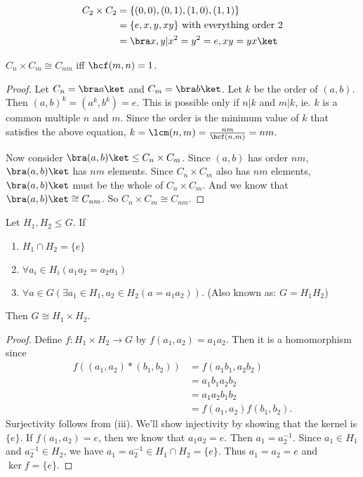 \documentclass[a4paper]{article}
\begin{document}
\begin{eg}
  \begin{align*}
    C_2\times C_2 &= \{(0, 0), (0, 1), (1, 0), (1, 1)\}\\
    &= \{e, x, y, xy\} \text{ with everything order 2}\\
    &= \bra x, y|x^2=y^2=e, xy = yx\ket
  \end{align*}
\end{eg}

\begin{prop}
  $C_n\times C_m\cong C_{nm}$ iff $\hcf(m, n) = 1$.
\end{prop}

\begin{proof}
  Let $C_n = \bra a\ket$ and $C_m = \bra b \ket$. Let $k$ be the order of $(a, b)$. Then $(a, b)^k = (a^k, b^k) = e$. This is possible only if $n | k$ and $m | k$, ie. $k$ is a common multiple $n$ and $m$. Since the order is the minimum value of $k$ that satisfies the above equation, $k = \lcm(n, m) = \frac{nm}{\hcf(n, m)} = nm$.

  Now consider $\bra (a, b)\ket \leq C_n\times C_m$. Since $(a, b)$ has order $nm$, $\bra (a, b)\ket$ has $nm$ elements. Since $C_n\times C_m$ also has $nm$ elements, $\bra (a, b)\ket$ must be the whole of $C_n\times C_m$. And we know that $\bra (a, b)\ket\cong C_{nm}$. So $C_n\times C_m \cong C_{nm}$.
\end{proof}

\begin{prop}
  Let $H_1, H_2\leq G$. If
  \begin{enumerate}
    \item $H_1\cap H_2 = \{e\}$
    \item $\forall a_i\in H_i(a_1a_2=a_2a_1)$
    \item $\forall a\in G(\exists a_1\in H_1, a_2\in H_2(a = a_1a_2))$. (Also known as: $G=H_1H_2$)
  \end{enumerate}
  Then $G\cong H_1\times H_2$.
\end{prop}

\begin{proof}
  Define $f:H_1\times H_2\rightarrow G$ by $f(a_1, a_2) = a_1a_2$. Then it is a homomorphism since
  \begin{align*}
    f((a_1, a_2)*(b_1,b_2)) &= f(a_1b_1, a_2b_2)\\
    &= a_1b_1a_2b_2\\
    &= a_1a_2b_1b_2\\
    &= f(a_1, a_2)f(b_1,b_2).
  \end{align*}
  Surjectivity follows from (iii). We'll show injectivity by showing that the kernel is $\{e\}$. If $f(a_1, a_2)=e$, then we know that $a_1a_2 = e$. Then $a_1=a_2^{-1}$. Since $a_1 \in H_1$ and $a_2^{-1} \in H_2$, we have $a_1 = a_2^{-1} \in H_1\cap H_2 = \{e\}$. Thus $a_1 = a_2 = e$ and $\ker f = \{e\}$.
\end{proof}
\end{document}
